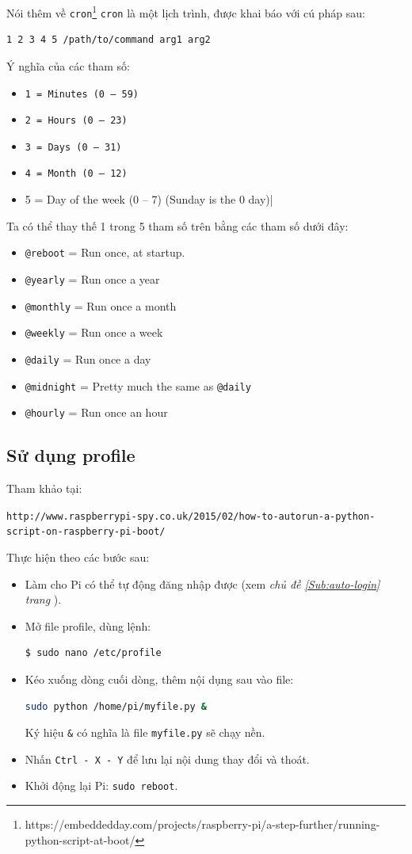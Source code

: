 Nói thêm về \verb|cron|\footnote{\textsf{https://embeddedday.com/projects/raspberry-pi/a-step-further/running-python-script-at-boot/}} \verb|cron| là một lịch trình, được khai báo với cú pháp sau:
\begin{lstlisting}[language=bash]
1 2 3 4 5 /path/to/command arg1 arg2
\end{lstlisting}
Ý nghĩa của các tham số:
\begin{itemize}
\item \verb|1 = Minutes (0 – 59)|
\item \verb|2 = Hours (0 – 23)|
\item \verb|3 = Days (0 – 31)|
\item \verb|4 = Month (0 – 12)|
\item 5 = Day of the week (0 – 7) (Sunday is the 0 day)|
\end{itemize}
Ta có thể thay thế 1 trong 5 tham số trên bằng các tham số dưới đây:
\begin{itemize}
\item \verb|@reboot|	= Run once, at startup.
\item \verb|@yearly|	= Run once a year
\item \verb|@monthly| = Run once a month
\item \verb|@weekly|	= Run once a week
\item \verb|@daily| = Run once a day
\item \verb|@midnight| = Pretty much the same as \verb|@daily|
\item \verb|@hourly|	= Run once an hour
\end{itemize}
\subsection{Sử dụng profile}
Tham khảo tại:

\begin{footnotesize}
\verb|http://www.raspberrypi-spy.co.uk/2015/02/how-to-autorun-a-python-script-on-raspberry-pi-boot/|
\end{footnotesize}

Thực hiện theo các bước sau:
\begin{itemize}
\item Làm cho Pi có thể tự động đăng nhập được (xem \textit{chủ đề \ref{Sub:auto-login} trang \pageref{Sub:auto-login}}).
\item Mở file profile, dùng lệnh: 
\begin{lstlisting}[language=bash]
$ sudo nano /etc/profile
\end{lstlisting}
\item Kéo xuống dòng cuối dòng, thêm nội dụng sau vào file:
\begin{lstlisting}[language=bash]
sudo python /home/pi/myfile.py &
\end{lstlisting}
Ký hiệu \verb|&| có nghĩa là file \verb|myfile.py| sẽ chạy nền.
\item Nhấn \verb|Ctrl - X - Y| để lưu lại nội dung thay đổi và thoát.
\item Khởi động lại Pi: \verb|sudo reboot|.
\end{itemize}
